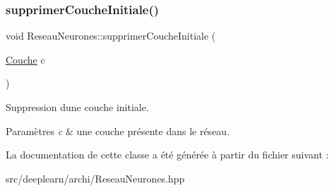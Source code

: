 \subsubsection{\texorpdfstring{supprimer\+Couche\+Initiale()}{supprimerCoucheInitiale()}}
{\footnotesize\ttfamily void Reseau\+Neurones\+::supprimer\+Couche\+Initiale (\begin{DoxyParamCaption}\item[{\hyperlink{classCouche}{Couche}}]{c }\end{DoxyParamCaption})}



Suppression d\textquotesingle{}une couche initiale. 


\begin{DoxyParams}{Paramètres}
{\em c} & une couche présente dans le réseau. \\
\hline
\end{DoxyParams}


La documentation de cette classe a été générée à partir du fichier suivant \+:\begin{DoxyCompactItemize}
\item 
src/deeplearn/archi/Reseau\+Neurones.\+hpp\end{DoxyCompactItemize}
